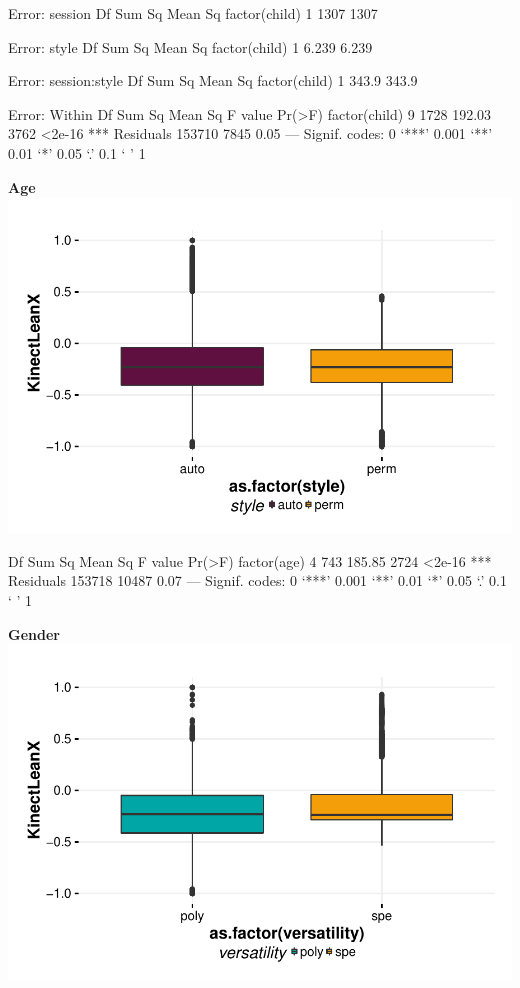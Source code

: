 \documentclass{article}
\begin{document}
\begin{Schunk}
\begin{Soutput}
Error: session
              Df Sum Sq Mean Sq
factor(child)  1   1307    1307

Error: style
              Df Sum Sq Mean Sq
factor(child)  1  6.239   6.239

Error: session:style
              Df Sum Sq Mean Sq
factor(child)  1  343.9   343.9

Error: Within
                  Df Sum Sq Mean Sq F value Pr(>F)    
factor(child)      9   1728  192.03    3762 <2e-16 ***
Residuals     153710   7845    0.05                   
---
Signif. codes:  0 ‘***’ 0.001 ‘**’ 0.01 ‘*’ 0.05 ‘.’ 0.1 ‘ ’ 1
\end{Soutput}
\end{Schunk}

\textbf{Age}
\includegraphics{features-plot_leanx_style_quiz}

\begin{Schunk}
\begin{Soutput}
                Df Sum Sq Mean Sq F value Pr(>F)    
factor(age)      4    743  185.85    2724 <2e-16 ***
Residuals   153718  10487    0.07                   
---
Signif. codes:  0 ‘***’ 0.001 ‘**’ 0.01 ‘*’ 0.05 ‘.’ 0.1 ‘ ’ 1
\end{Soutput}
\end{Schunk}

\textbf{Gender}
\includegraphics{features-plot_leanx_gender_quiz}
\end{document}
